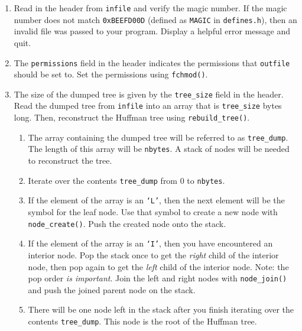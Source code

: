\begin{enumerate}
  \item Read in the header from \texttt{infile} and verify the magic
    number. If the magic number does not match \texttt{0xBEEFD00D}
    (defined as \texttt{MAGIC} in \texttt{defines.h}), then an invalid
    file was passed to your program. Display a helpful error message and
    quit.

  \item The \texttt{permissions} field in the header indicates the
    permissions that \texttt{outfile} should be set to. Set the
    permissions using \texttt{fchmod()}.

  \item The size of the dumped tree is given by the \texttt{tree\_size}
    field in the header. Read the dumped tree from \texttt{infile} into
    an array that is \texttt{tree\_size} bytes long. Then, reconstruct
    the Huffman tree using \texttt{rebuild\_tree()}.\label{rebuild}

    \begin{enumerate}
      \item The array containing the dumped tree will be referred to as
        \texttt{tree\_dump}. The length of this array will be
        \texttt{nbytes}. A stack of nodes will be needed to reconstruct
        the tree.

      \item Iterate over the contents \texttt{tree\_dump} from $0$ to
        \texttt{nbytes}.

      \item If the element of the array is an \texttt{`L'}, then the
        next element will be the symbol for the leaf node. Use that
        symbol to create a new node with \texttt{node\_create()}. Push
        the created node onto the stack.

      \item If the element of the array is an \texttt{`I'}, then you
        have encountered an interior node. Pop the stack once to get the
        \emph{right} child of the interior node, then pop again to get
        the \emph{left} child of the interior node. Note: the pop order
        \emph{is important}. Join the left and right nodes with
        \texttt{node\_join()} and push the joined parent node on the
        stack.

      \item There will be one node left in the stack after you finish
        iterating over the contents \texttt{tree\_dump}. This node is
        the root of the Huffman tree.
    \end{enumerate}


\end{enumerate}
